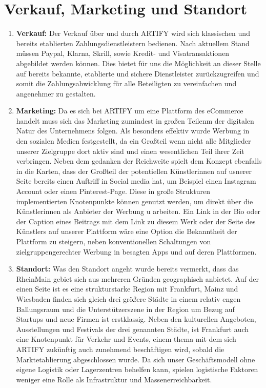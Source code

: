 \documentclass[11pt,a4paper]{report}
\begin{document}
\section{Verkauf, Marketing und Standort}
\begin{enumerate}
    \item \textbf{Verkauf:} \quad Der Verkauf über und durch ARTIFY wird sich klassischen und bereits etablierten Zahlungsdienstleistern bedienen. Nach aktuellem Stand müssen Paypal, Klarna, Skrill, sowie Kredit- und Visatransaktionen abgebildet werden können. Dies bietet für uns die Möglichkeit an dieser Stelle auf bereits bekannte, etablierte und sichere Dienstleister zurückzugreifen und somit die Zahlungsabwicklung für alle Beteiligten zu vereinfachen und angenehmer zu gestalten. 
    \item \textbf{Marketing:} \quad Da es sich bei ARTIFY um eine Plattform des eCommerce handelt muss sich das Marketing zumindest in großen Teilenm der digitalen Natur des Unternehmens folgen. Als besonders effektiv wurde Werbung in den sozialen Medien festgestellt, da ein Großteil wenn nicht alle Mitglieder unserer Zielgruppe dort aktiv sind und einen wesentlichen Teil ihrer Zeit verbringen. Neben dem gedanken der Reichweite spielt dem Konzept ebenfalls in die Karten, dass der Großteil der potentiellen Künstlerinnen auf usnerer Seite bereits einen Auftriff in Social media hat, um Beispiel einen Instagram Account oder einen Pinterest-Page. Diese in große Strukturen implementierten Knotenpunkte können genutzt werden, um direkt über die Künstlerinnen als Anbieter der Werbung u arbeiten. Ein Link in der Bio oder der Caption eines Beitrags mit dem Link zu diesem Werk oder der Seite des Künstlers auf unserer Plattform wäre eine Option die Bekanntheit der Plattform zu steigern, neben konventionellen Schaltungen von zielgruppengerechter Werbung in besagten Apps und auf deren Plattformen.
    \item \textbf{Standort:} \quad Was den Standort angeht wurde bereits vermerkt, dass das RheinMain gebiet sich aus mehreren Gründen geographisch anbietet. Auf der einen Seite ist es eine strukturstarke Region mit Frankfurt, Mainz und Wiesbaden finden sich gleich drei größere Städte in einem relativ engen Ballungsraum und die Unterstützerszene in der Region um Bezug auf Startups und neue Firmen ist erstklassig. Neben den kulturellen Angeboten, Ausstellungen und Festivals der drei genannten Städte, ist Frankfurt auch eine Knotenpunkt für Verkehr und Events, einem thema mit dem sich ARTIFY zukünftig auch zunehmend beschäftigen wird, sobald die Marktetablierung abgeschlossen wurde. Da sich unser Geschäftsmodell ohne eigene Logistik oder Lagerzentren behelfen kann, spielen logistische Faktoren weniger eine Rolle als Infrastruktur und Massenerreichbarkeit.
\end{enumerate}
\end{document}
